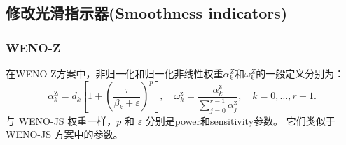 \documentclass{book}
\begin{document}
\begin{example}
\begin{example}{}{}
\begin{example}
\begin{example}
\begin{example}
\subsection{修改光滑指示器(Smoothness indicators)}
\subsubsection{WENO-Z}
在WENO-Z方案中，非归一化和归一化非线性权重$\alpha_{k}^{Z}$和$\omega_{k}^{Z}$的一般定义分别为：
\begin{equation}
    \alpha_{k}^{\mathrm{Z}}=d_{k}\left[1+\left(\frac{\tau}{\beta_{k}+\varepsilon}\right)^{p}\right], \quad \omega_{k}^{\mathrm{z}}=\frac{\alpha_{k}^{\mathrm{z}}}{\sum_{j=0}^{r-1} \alpha_{j}^{\mathrm{z}}}, \quad k=0, \ldots, r-1 .
\end{equation}
与 WENO-JS 权重一样，$p$ 和 $\varepsilon$ 分别是power和sensitivity参数。 它们类似于 WENO-JS 方案中的参数。


\end{example}
\end{example}
\end{example}
\end{example}
\end{example}
\end{document}
